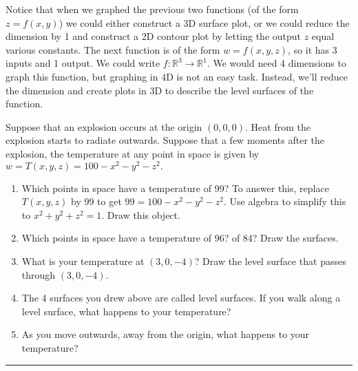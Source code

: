 Notice that when we graphed the previous two functions (of the form $z=f(x,y)$) we could either construct a 3D surface plot, or we could reduce the dimension by 1 and construct a 2D contour plot by letting the output $z$ equal various constants. 
The next function is of the form $w=f(x,y,z)$, so it has 3 inputs and 1 output.  We could write $f:\mathbb{R}^3\to\mathbb{R}^1$. We would need 4 dimensions to graph this function, but graphing in 4D is not an easy task.  Instead, we'll reduce the dimension and create plots in 3D to describe the level surfaces of the function.

\begin{problem}%
%
 Suppose that an explosion occurs at the origin $(0,0,0)$. Heat from the explosion starts to radiate outwards.  Suppose that a few moments after the explosion, the temperature at any point in space is given by $w=T(x,y,z)=100-x^2-y^2-z^2.$ 
\begin{enumerate}
 \item Which points in space have a temperature of 99?  To answer this, replace $T(x,y,z)$ by $99$ to get $99=100-x^2-y^2-z^2$. Use algebra to simplify this to $x^2+y^2+z^2=1$.  Draw this object.
 \item Which points in space have a temperature of 96? of 84? Draw the surfaces. 
 \item What is your temperature at $(3,0,-4)$? Draw the level surface that passes through $(3,0,-4)$.
\item The 4 surfaces you drew above are called level surfaces. If you walk along a level surface, what happens to your temperature?
 \item As you move outwards, away from the origin, what happens to your temperature?
\end{enumerate}
\hrule\end{problem}

